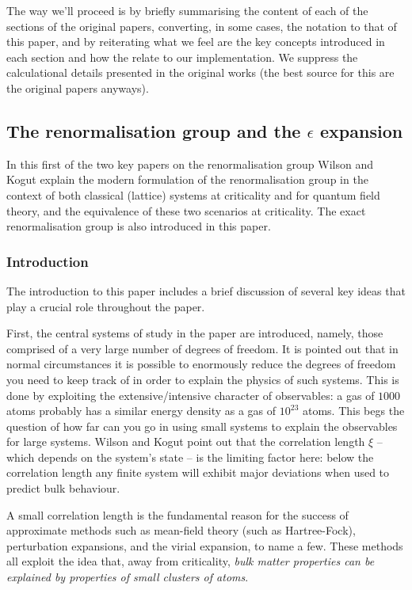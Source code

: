 \documentclass[11pt]{amsart}
\theoremstyle{plain}%
\theoremstyle{definition}
\theoremstyle{remark}
\begin{document}
The way we'll proceed is by briefly summarising the content of each of the sections of the original papers, converting, in some cases, the notation to that of this paper, and by reiterating what we feel are the key concepts introduced in each section and how the relate to our implementation. We suppress the calculational details presented in the original works (the best source for this are the original papers anyways).

\subsection{The renormalisation group and the $\epsilon$ expansion}
In this first of the two key papers on the renormalisation group Wilson and Kogut explain the modern formulation of the renormalisation group in the context of both classical (lattice) systems at criticality and for quantum field theory, and the equivalence of these two scenarios at criticality. The exact renormalisation group is also introduced in this paper. 


\subsubsection{Introduction}
The introduction to this paper includes a brief discussion of several key ideas that play a crucial role throughout the paper. 

First, the central systems of study in the paper are introduced, namely, those comprised of a very large number of degrees of freedom. It is pointed out that in normal circumstances it is possible to enormously reduce the degrees of freedom you need to keep track of in order to explain the physics of such systems. This is done by exploiting the extensive/intensive character of observables: a gas of $1000$ atoms probably has a similar energy density as a gas of $10^{23}$ atoms. This begs the question of how far can you go in using small systems to explain the observables for large systems. Wilson and Kogut point out that the correlation length $\xi$ -- which depends on the system's state -- is the limiting factor here: below the correlation length any finite system will exhibit major deviations when used to predict bulk behaviour.

A small correlation length is the fundamental reason for the success of approximate methods such as mean-field theory (such as Hartree-Fock), perturbation expansions, and the virial expansion, to name a few. These methods all exploit the idea that, away from criticality, \emph{bulk matter properties can be explained by properties of small clusters of atoms}. 
\end{document}
